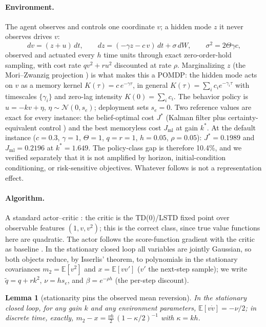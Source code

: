 \documentclass[11pt]{article}
\newtheorem{lemma}{Lemma}
\newcommand{\Jml}{J_{\mathrm{ml}}}
\newcommand{\E}{\mathbb{E}}
\begin{document}
\paragraph{Environment.} The agent observes and controls one coordinate $v$; a hidden mode $z$
it never observes drives $v$:
\[
dv = (z+u)\,dt, \qquad dz = (-\gamma z - c\,v)\,dt + \sigma\,dW, \qquad \sigma^2 = 2\Theta\gamma c,
\]
observed and actuated every $h$ time units through exact zero-order-hold sampling, with cost
rate $qv^2 + ru^2$ discounted at rate $\rho$. Marginalizing $z$ (the Mori--Zwanzig projection
\cite{zwanzig,mori}) is what makes this a POMDP: the hidden mode acts on $v$ as a memory kernel
$K(\tau) = c\,e^{-\gamma\tau}$, in general $K(\tau)=\sum_i c_i e^{-\gamma_i \tau}$ with
timescales $\{\gamma_i\}$ and zero-lag intensity $K(0)=\sum_i c_i$. The behavior policy is
$u = -kv + \eta$, $\eta \sim \mathcal N(0, s_e)$; deployment sets $s_e = 0$. Two reference
values are exact for every instance: the belief-optimal cost $J^\ast$ (Kalman filter plus
certainty-equivalent control \cite{kalman,astrom}) and the best memoryless cost $\Jml$ at gain
$k^\ast$. At the default instance ($c{=}0.3$, $\gamma{=}1$, $\Theta{=}1$, $q{=}r{=}1$,
$h{=}0.05$, $\rho{=}0.05$): $J^\ast = 0.1989$ and $\Jml = 0.2196$ at $k^\ast = 1.649$. The
policy-class gap is therefore 10.4\%, and we verified separately that it is not amplified by
horizon, initial-condition conditioning, or risk-sensitive objectives. Whatever follows is not
a representation effect.

\paragraph{Algorithm.} A standard actor--critic \cite{konda}: the critic is the TD(0)/LSTD
fixed point \cite{sutton88,lstd} over observable features $(1, v, v^2)$; this is the correct
class, since true value functions here are quadratic. The actor follows the score-function
gradient with the critic as baseline \cite{williams}. In the stationary closed loop all
variables are jointly Gaussian, so both objects reduce, by Isserlis' theorem, to polynomials
in the stationary covariances $m_2 = \E[v^2]$ and $x = \E[v v']$ ($v'$ the next-step sample);
we write $\tilde q = q + rk^2$, $\nu = h s_e$, and $\beta = e^{-\rho h}$ (the per-step
discount).

\begin{lemma}[stationarity pins the observed mean reversion]\label{lem:pin}
In the stationary closed loop, for any gain $k$ and any environment parameters,
$\E[v\dot v] = -\nu/2$; in discrete time, exactly,
$m_2 - x = \tfrac{\nu h}{2}\,(1-\kappa/2)^{-1}$ with $\kappa = kh$.
\end{lemma}
\end{document}
